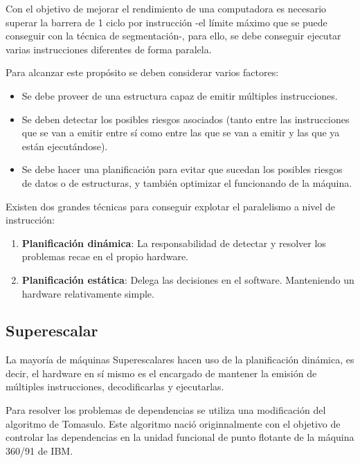 Con el objetivo de mejorar el rendimiento de una computadora es necesario superar la barrera
de 1 ciclo por instrucción -el límite máximo que se puede conseguir con la técnica de segmentación-,
para ello, se debe conseguir ejecutar varias instrucciones diferentes de forma paralela.

\bigskip
Para alcanzar este propósito se deben considerar varios factores:

\begin{itemize}

\item Se debe proveer de una estructura capaz de emitir múltiples instrucciones.

\item Se deben detectar los posibles riesgos asociados (tanto entre las instrucciones que se van a 
emitir entre sí como entre las que se van a emitir y las que ya están ejecutándose). 

\item Se debe hacer una planificación para evitar que sucedan los posibles riesgos de datos o 
de estructuras, y también optimizar el funcionando de la máquina.

\end{itemize}

\bigskip
Existen dos grandes técnicas para conseguir explotar el paralelismo a nivel de instrucción:

\begin{enumerate}

\item \textbf{Planificación dinámica}: La responsabilidad de detectar y resolver los problemas recae
en el propio hardware.

\item \textbf{Planificación estática}: Delega las decisiones en el software. Manteniendo un hardware
relativamente simple.

\end{enumerate}

\subsection{Superescalar}

La mayoría de máquinas Superescalares hacen uso de la planificación dinámica, es decir, el hardware 
en sí mismo es el encargado de mantener la emisión de múltiples instrucciones, decodificarlas y 
ejecutarlas.

\bigskip
Para resolver los problemas de dependencias se utiliza una modificación del algoritmo de Tomasulo.
Este algoritmo nació originnalmente con el objetivo de controlar las dependencias en la unidad
funcional de punto flotante de la máquina 360/91 de IBM.

